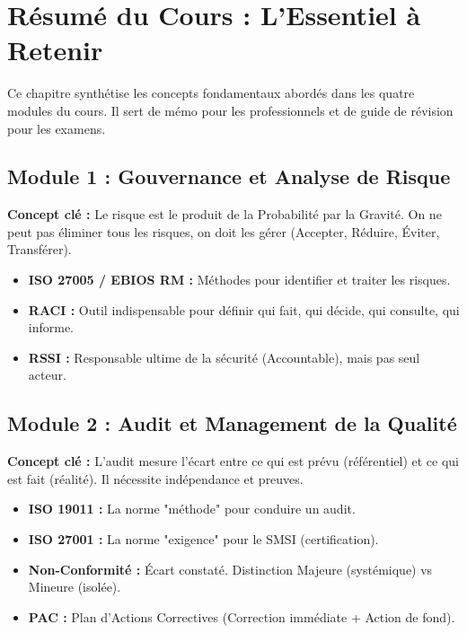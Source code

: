 \chapter{Résumé du Cours : L'Essentiel à Retenir}
\label{chap:resume}

Ce chapitre synthétise les concepts fondamentaux abordés dans les quatre modules du cours. Il sert de mémo pour les professionnels et de guide de révision pour les examens.

\section{Module 1 : Gouvernance et Analyse de Risque}
\textbf{Concept clé :} Le risque est le produit de la Probabilité par la Gravité. On ne peut pas éliminer tous les risques, on doit les gérer (Accepter, Réduire, Éviter, Transférer).
\begin{itemize}
    \item \textbf{ISO 27005 / EBIOS RM :} Méthodes pour identifier et traiter les risques.
    \item \textbf{RACI :} Outil indispensable pour définir qui fait, qui décide, qui consulte, qui informe.
    \item \textbf{RSSI :} Responsable ultime de la sécurité (Accountable), mais pas seul acteur.
\end{itemize}

\section{Module 2 : Audit et Management de la Qualité}
\textbf{Concept clé :} L'audit mesure l'écart entre ce qui est prévu (référentiel) et ce qui est fait (réalité). Il nécessite indépendance et preuves.
\begin{itemize}
    \item \textbf{ISO 19011 :} La norme "méthode" pour conduire un audit.
    \item \textbf{ISO 27001 :} La norme "exigence" pour le SMSI (certification).
    \item \textbf{Non-Conformité :} Écart constaté. Distinction Majeure (systémique) vs Mineure (isolée).
    \item \textbf{PAC :} Plan d'Actions Correctives (Correction immédiate + Action de fond).
\end{itemize}


